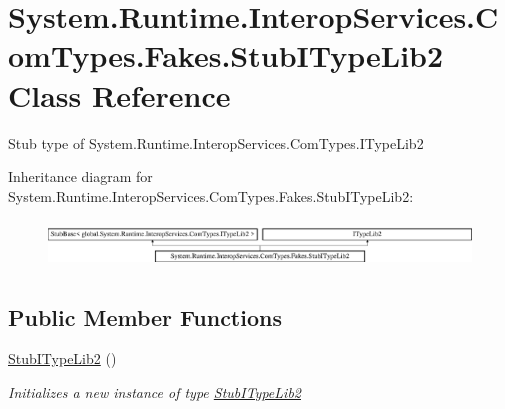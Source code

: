 \hypertarget{class_system_1_1_runtime_1_1_interop_services_1_1_com_types_1_1_fakes_1_1_stub_i_type_lib2}{\section{System.\-Runtime.\-Interop\-Services.\-Com\-Types.\-Fakes.\-Stub\-I\-Type\-Lib2 Class Reference}
\label{class_system_1_1_runtime_1_1_interop_services_1_1_com_types_1_1_fakes_1_1_stub_i_type_lib2}
}


Stub type of System.\-Runtime.\-Interop\-Services.\-Com\-Types.\-I\-Type\-Lib2 


Inheritance diagram for System.\-Runtime.\-Interop\-Services.\-Com\-Types.\-Fakes.\-Stub\-I\-Type\-Lib2\-:\begin{figure}[H]
\begin{center}
\leavevmode
\includegraphics[height=1.278539cm]{class_system_1_1_runtime_1_1_interop_services_1_1_com_types_1_1_fakes_1_1_stub_i_type_lib2}
\end{center}
\end{figure}
\subsection*{Public Member Functions}
\begin{DoxyCompactItemize}
\item 
\hyperlink{class_system_1_1_runtime_1_1_interop_services_1_1_com_types_1_1_fakes_1_1_stub_i_type_lib2_a30116c21002c25d87b5ba841a2044e06}{Stub\-I\-Type\-Lib2} ()
\begin{DoxyCompactList}\small\item\em Initializes a new instance of type \hyperlink{class_system_1_1_runtime_1_1_interop_services_1_1_com_types_1_1_fakes_1_1_stub_i_type_lib2}{Stub\-I\-Type\-Lib2}\end{DoxyCompactList}\end{DoxyCompactItemize}
